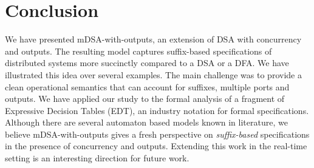 \section{Conclusion}

We have presented mDSA-with-outputs, an extension of DSA with concurrency and outputs. The resulting model captures suffix-based specifications of distributed systems more succinctly compared to a DSA or a DFA. We have illustrated this idea over several examples. The main challenge was to provide a clean operational semantics that can account for suffixes, multiple ports and outputs. We have applied our study to the formal analysis of a fragment of Expressive Decision Tables (EDT), an industry notation for formal specifications. Although there are several automaton based models known in literature, we believe mDSA-with-outputs gives a fresh perspective on \emph{suffix-based} specifications in the presence of concurrency and outputs. Extending this work in the real-time setting is an interesting direction for future work. 
